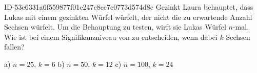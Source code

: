 \begin{exercise}
      {ID-53e6331a6f559877f01e247c8cc7e0773d574d8c}
      {Gezinkt}
  \ifproblem\problem
    Laura behauptet, dass Lukas mit einem gezinkten Würfel würfelt, der nicht
    die zu erwartende Anzahl Sechsen würfelt. Um die Behauptung zu testen,
    wirft sie Lukas Würfel $n$-mal. Wie ist bei einem Signifikanzniveau von
     zu entscheiden, wenn dabei $k$ Sechsen fallen?
    \begin{center}
      a) $n=25$, $k=6$
      \qquad\qquad
      b) $n=50$, $k=12$
      \qquad\qquad
      c) $n=100$, $k=24$
    \end{center}
  \fi
\end{exercise}
